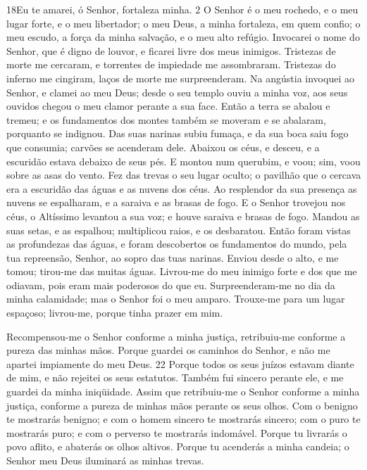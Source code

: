 \lettrine{18}{}Eu te amarei, ó Senhor, fortaleza minha. 2 O
Senhor é o meu rochedo, e o meu lugar forte, e o meu libertador; o
meu Deus, a minha fortaleza, em quem confio; o meu escudo, a força
da minha salvação, e o meu alto refúgio. Invocarei o nome do
Senhor, que é digno de louvor, e ficarei livre dos meus inimigos.
Tristezas de morte me cercaram, e torrentes de impiedade me
assombraram. Tristezas do inferno me cingiram, laços de morte me
surpreenderam. Na angústia invoquei ao Senhor, e clamei ao meu
Deus; desde o seu templo ouviu a minha voz, aos seus ouvidos chegou
o meu clamor perante a sua face. Então a terra se abalou e
tremeu; e os fundamentos dos montes também se moveram e se abalaram,
porquanto se indignou. Das suas narinas subiu fumaça, e da sua
boca saiu fogo que consumia; carvões se acenderam dele. Abaixou
os céus, e desceu, e a escuridão estava debaixo de seus pés.
E montou num querubim, e voou; sim, voou sobre as asas do
vento. Fez das trevas o seu lugar oculto; o pavilhão que o
cercava era a escuridão das águas e as nuvens dos céus. Ao
resplendor da sua presença as nuvens se espalharam, e a saraiva e as
brasas de fogo. E o Senhor trovejou nos céus, o Altíssimo
levantou a sua voz; e houve saraiva e brasas de fogo. Mandou
as suas setas, e as espalhou; multiplicou raios, e os desbaratou.
Então foram vistas as profundezas das águas, e foram
descobertos os fundamentos do mundo, pela tua repreensão, Senhor, ao
sopro das tuas narinas. Enviou desde o alto, e me tomou;
tirou-me das muitas águas. Livrou-me do meu inimigo forte e
dos que me odiavam, pois eram mais poderosos do que eu.
Surpreenderam-me no dia da minha calamidade; mas o Senhor foi
o meu amparo. Trouxe-me para um lugar espaçoso; livrou-me,
porque tinha prazer em mim.

Recompensou-me o Senhor conforme a minha justiça, retribuiu-me
conforme a pureza das minhas mãos. Porque guardei os caminhos
do Senhor, e não me apartei impiamente do meu Deus. 22 Porque todos
os seus juízos estavam diante de mim, e não rejeitei os seus
estatutos. Também fui sincero perante ele, e me guardei da
minha iniqüidade. Assim que retribuiu-me o Senhor conforme a
minha justiça, conforme a pureza de minhas mãos perante os seus
olhos. Com o benigno te mostrarás benigno; e com o homem
sincero te mostrarás sincero; com o puro te mostrarás puro; e
com o perverso te mostrarás indomável. Porque tu livrarás o
povo aflito, e abaterás os olhos altivos. Porque tu acenderás
a minha candeia; o Senhor meu Deus iluminará as minhas trevas.

